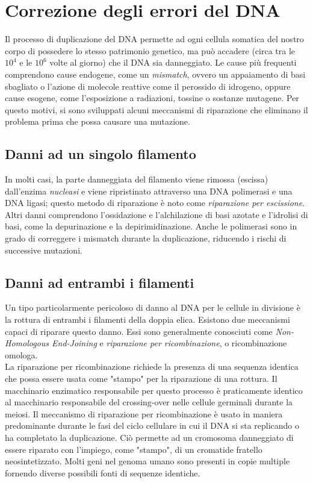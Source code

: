 \documentclass[11pt]{report}
\begin{document}
	\section{Correzione degli errori del DNA}
	
	Il processo di duplicazione del DNA permette ad ogni cellula somatica del nostro corpo di possedere lo stesso patrimonio genetico, ma può accadere (circa tra le $10^4$ e le $10^6$ volte al giorno\cite{lodish2008molecular}) che il DNA sia danneggiato. Le cause più frequenti comprendono cause endogene, come un \textit{mismatch}, ovvero un appaiamento di basi sbagliato o l'azione di molecole reattive come il perossido di idrogeno, oppure cause esogene, come l'esposizione a radiazioni, tossine o sostanze mutagene. Per questo motivi, si sono sviluppati alcuni meccanismi di riparazione che eliminano il problema prima che possa causare una mutazione. 
	
	\subsection{Danni ad un singolo filamento}
	
	In molti casi, la parte danneggiata del filamento viene rimossa (escissa) dall'enzima \textit{nucleasi} e viene ripristinato attraverso una DNA polimerasi e una DNA ligasi; questo metodo di riparazione è noto come \textit{riparazione per escissione}. Altri danni comprendono l'ossidazione e l'alchilazione di basi azotate e l'idrolisi di basi, come la depurinazione e la depirimidinazione. Anche le polimerasi sono in grado di correggere i mismatch durante la duplicazione, riducendo i rischi di successive mutazioni. 
	
	\subsection{Danni ad entrambi i filamenti}
	
	Un tipo particolarmente pericoloso di danno al DNA per le cellule in divisione è la rottura di entrambi i filamenti della doppia elica. Esistono due meccanismi capaci di riparare questo danno. Essi sono generalmente conosciuti come \textit{Non-Homologous End-Joining} e \textit{riparazione per ricombinazione}, o ricombinazione omologa.\\
	
	La riparazione per ricombinazione richiede la presenza di una sequenza identica che possa essere usata come "stampo" per la riparazione di una rottura. Il macchinario enzimatico responsabile per questo processo è praticamente identico al macchinario responsabile del crossing-over nelle cellule germinali durante la meiosi.\cite{albert2005principles} Il meccanismo di riparazione per ricombinazione è usato in maniera predominante durante le fasi del ciclo cellulare in cui il DNA si sta replicando o ha completato la duplicazione. Ciò permette ad un cromosoma danneggiato di essere riparato con l'impiego, come "stampo", di un cromatide fratello neosintetizzato. Molti geni nel genoma umano sono presenti in copie multiple fornendo diverse possibili fonti di sequenze identiche.\\
	
\end{document}
